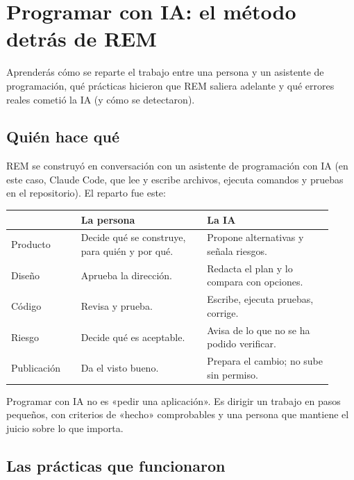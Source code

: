 \chapter{Programar con IA: el método detrás de REM}\label{cap:metodo}

\begin{objbox}
Aprenderás cómo se reparte el trabajo entre una persona y un asistente de programación, qué prácticas hicieron que REM saliera adelante y qué errores reales cometió la IA (y cómo se detectaron).
\end{objbox}

\section{Quién hace qué}
REM se construyó en conversación con un asistente de programación con IA (en este caso, Claude Code, que lee y escribe archivos, ejecuta comandos y pruebas en el repositorio). El reparto fue este:

\begin{center}
\begin{tabular}{@{}p{0.2\linewidth}p{0.36\linewidth}p{0.36\linewidth}@{}}
\toprule
 & \textbf{La persona} & \textbf{La IA} \\
\midrule
Producto & Decide qué se construye, para quién y por qué. & Propone alternativas y señala riesgos. \\
Diseño & Aprueba la dirección. & Redacta el plan y lo compara con opciones. \\
Código & Revisa y prueba. & Escribe, ejecuta pruebas, corrige. \\
Riesgo & Decide qué es aceptable. & Avisa de lo que no se ha podido verificar. \\
Publicación & Da el visto bueno. & Prepara el cambio; no sube sin permiso. \\
\bottomrule
\end{tabular}
\end{center}

\begin{ideabox}
Programar con IA no es «pedir una aplicación». Es dirigir un trabajo en pasos pequeños, con criterios de «hecho» comprobables y una persona que mantiene el juicio sobre lo que importa.
\end{ideabox}

\section{Las prácticas que funcionaron}

